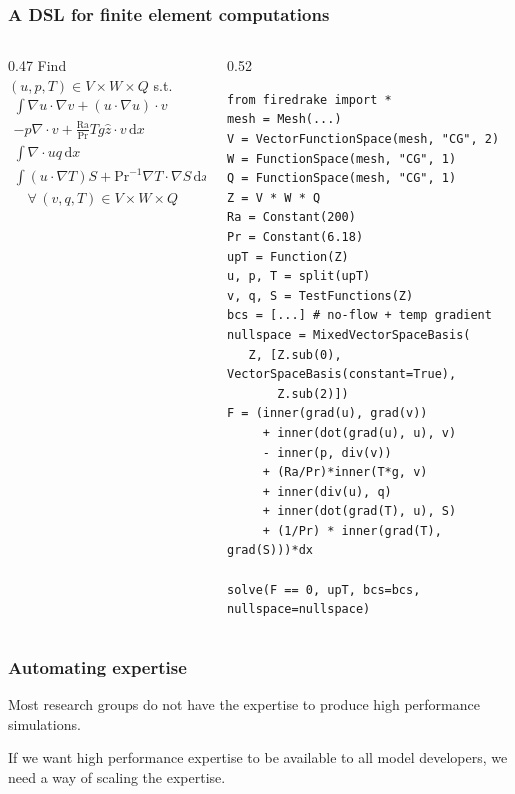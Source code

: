 \documentclass[presentation]{beamer}
\begin{document}
\begin{frame}[fragile]
  \frametitle{A DSL for finite element computations}
  \begin{columns}
    \begin{column}{0.47\framewidth}
      {\small
        Find $(u, p, T) \in V\times W\times Q$ s.t.
        \begin{align*}
          \int\!\nabla u \cdot \nabla v + (u \cdot \nabla u) \cdot v \\
          - p\nabla\cdot v + \frac{\text{Ra}}{\text{Pr}} Tg \hat{z} \cdot v\,\text{d}x &= 0 \\
          \int\!\nabla\cdot u q\,\text{d}x&= 0\\
          \int\! (u\cdot \nabla T) S + \text{Pr}^{-1} \nabla T \cdot \nabla
          S\,\text{d}x &= 0\\
          \quad \forall\, (v,q,T) \in V\times W \times Q
        \end{align*}
        }
    \end{column}
    \begin{column}{0.52\framewidth}
\begin{verbatim}
from firedrake import *
mesh = Mesh(...)
V = VectorFunctionSpace(mesh, "CG", 2)
W = FunctionSpace(mesh, "CG", 1)
Q = FunctionSpace(mesh, "CG", 1)
Z = V * W * Q
Ra = Constant(200)
Pr = Constant(6.18)
upT = Function(Z)
u, p, T = split(upT)
v, q, S = TestFunctions(Z)
bcs = [...] # no-flow + temp gradient
nullspace = MixedVectorSpaceBasis(
   Z, [Z.sub(0), VectorSpaceBasis(constant=True),
       Z.sub(2)])
F = (inner(grad(u), grad(v))
     + inner(dot(grad(u), u), v)
     - inner(p, div(v))
     + (Ra/Pr)*inner(T*g, v)
     + inner(div(u), q)
     + inner(dot(grad(T), u), S)
     + (1/Pr) * inner(grad(T), grad(S)))*dx

solve(F == 0, upT, bcs=bcs, nullspace=nullspace)
\end{verbatim}
    \end{column}
  \end{columns}  
\end{frame}

\begin{frame}
  \frametitle{Automating expertise}
  \begin{lemma}
    Most research groups do not have the expertise to produce high
    performance simulations.
  \end{lemma}
  \begin{corollary}
    If we want high performance expertise to be available to all model
    developers, we need a way of scaling the expertise.

  \end{corollary}
\end{frame}
\end{document}
